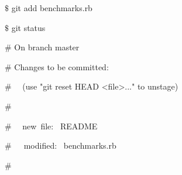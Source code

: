 \vspace{14pt}
\noindent 
{\fontsize{14pt}{14pt}\selectfont  $  \$  $ git add benchmarks.rb \\} \par
\noindent 
{\fontsize{14pt}{14pt}\selectfont  $  \$  $ git status \\} \par
\noindent 
{\fontsize{14pt}{14pt}\selectfont  $  \#  $ On branch master \\} \par
\noindent 
{\fontsize{14pt}{14pt}\selectfont  $  \#  $ Changes to be committed: \\} \par
\noindent 
{\fontsize{14pt}{14pt}\selectfont  $  \#  $~~ (use "git reset HEAD <file>..." to unstage) \\} \par
\noindent 
{\fontsize{14pt}{14pt}\selectfont  $  \#  $ \\} \par
\noindent 
{\fontsize{14pt}{14pt}\selectfont  $  \#  $~~ new~file:~  README \\} \par
\noindent 
{\fontsize{14pt}{14pt}\selectfont  $  \#  $~~~modified:~  benchmarks.rb \\} \par
\noindent 
{\fontsize{14pt}{14pt}\selectfont  $  \#  $ \\} \par
\vspace{14pt}
